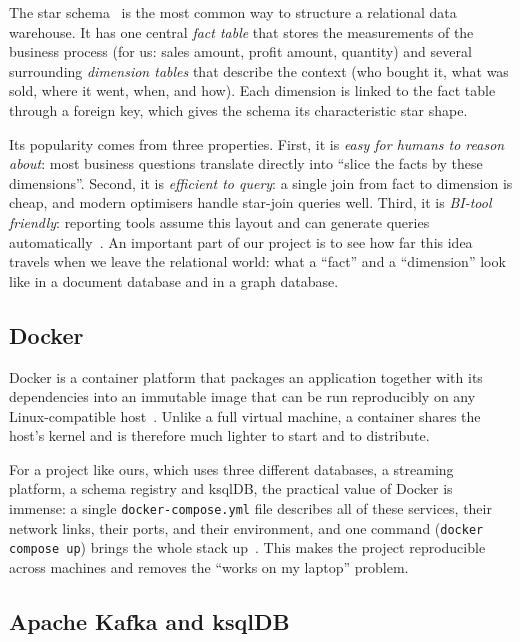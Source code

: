 \documentclass[11pt,a4paper]{article}
\begin{document}
The star schema~\cite{kimball2013toolkit} is the most common way to
structure a relational data warehouse. It has one central \emph{fact
table} that stores the measurements of the business process (for us: sales
amount, profit amount, quantity) and several surrounding \emph{dimension
tables} that describe the context (who bought it, what was sold, where it
went, when, and how). Each dimension is linked to the fact table through a
foreign key, which gives the schema its characteristic star shape.

Its popularity comes from three properties. First, it is \emph{easy for
humans to reason about}: most business questions translate directly into
``slice the facts by these dimensions''. Second, it is \emph{efficient to
query}: a single join from fact to dimension is cheap, and modern
optimisers handle star-join queries well. Third, it is \emph{BI-tool
friendly}: reporting tools assume this layout and can generate queries
automatically~\cite{kimball2013toolkit}. An important part of our project
is to see how far this idea travels when we leave the relational world:
what a ``fact'' and a ``dimension'' look like in a document database and in
a graph database.

\subsection{Docker}

Docker is a container platform that packages an application together with
its dependencies into an immutable image that can be run reproducibly on
any Linux-compatible host~\cite{docker_docs,merkel2014docker}. Unlike a
full virtual machine, a container shares the host's kernel and is
therefore much lighter to start and to distribute.

For a project like ours, which uses three different databases, a streaming
platform, a schema registry and ksqlDB, the practical value of Docker is
immense: a single \texttt{docker-compose.yml} file describes all of these
services, their network links, their ports, and their environment, and one
command (\texttt{docker compose up}) brings the whole stack
up~\cite{docker_compose_docs}. This makes the project reproducible across
machines and removes the ``works on my laptop'' problem.

\subsection{Apache Kafka and ksqlDB}
\end{document}

